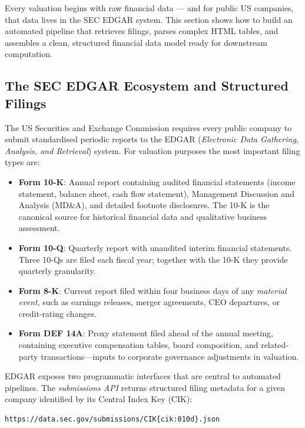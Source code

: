 \begin{context}
Every valuation begins with raw financial data — and for public US companies, that
data lives in the SEC EDGAR system. This section shows how to build an automated
pipeline that retrieves filings, parses complex HTML tables, and assembles a
clean, structured financial data model ready for downstream computation.

\subsection{The SEC EDGAR Ecosystem and Structured Filings}
\label{subsec:bv-extraction-edgar}

The US Securities and Exchange Commission requires every public company to submit
standardised periodic reports to the EDGAR (\emph{Electronic Data Gathering, Analysis,
and Retrieval}) system. For valuation purposes the most important filing types are:

\begin{itemize}
  \item \textbf{Form 10-K}: Annual report containing audited financial statements
        (income statement, balance sheet, cash flow statement), Management Discussion
        and Analysis (MD\&A), and detailed footnote disclosures. The 10-K is the
        canonical source for historical financial data and qualitative business
        assessment.
  \item \textbf{Form 10-Q}: Quarterly report with unaudited interim financial statements.
        Three 10-Qs are filed each fiscal year; together with the 10-K they provide
        quarterly granularity.
  \item \textbf{Form 8-K}: Current report filed within four business days of any
        \emph{material event}, such as earnings releases, merger agreements, CEO
        departures, or credit-rating changes.
  \item \textbf{Form DEF 14A}: Proxy statement filed ahead of the annual meeting,
        containing executive compensation tables, board composition, and related-party
        transactions---inputs to corporate governance adjustments in valuation.
\end{itemize}

EDGAR exposes two programmatic interfaces that are central to automated pipelines.
The \emph{submissions API} returns structured filing metadata for a given company
identified by its Central Index Key (CIK):

\begin{verbatim}
https://data.sec.gov/submissions/CIK{cik:010d}.json
\end{verbatim}


\end{context}
